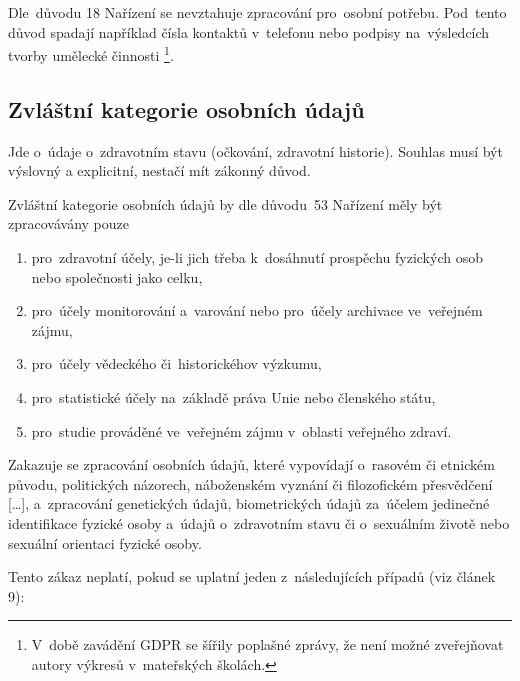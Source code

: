 Dle~důvodu 18 Nařízení se nevztahuje zpracování pro~osobní potřebu.
Pod~tento důvod spadají například čísla kontaktů v~telefonu nebo podpisy na~výsledcích tvorby umělecké činnosti%
\footnote{V~době zavádění GDPR se šířily poplašné zprávy, že není možné zveřejňovat autory výkresů v~mateřských školách.}.

\subsection{Zvláštní kategorie osobních údajů}

Jde o~údaje o~zdravotním stavu (očkování, zdravotní historie).
Souhlas musí být výslovný a explicitní, nestačí mít zákonný důvod.

Zvláštní kategorie osobních údajů by dle důvodu~53 Nařízení měly být zpracovávány pouze

\begin{enumerate}[label=\alph*)]
\item pro~zdravotní účely, je-li jich třeba k~dosáhnutí prospěchu fyzických osob nebo společnosti jako celku,
\item pro~účely monitorování a~varování nebo pro~účely archivace ve~veřejném zájmu,
\item pro~účely vědeckého či~historickéhov výzkumu,
\item pro~statistické účely na~základě práva Unie nebo členského státu,
\item pro~studie prováděné ve~veřejném zájmu v~oblasti veřejného zdraví.
\end{enumerate}

Zakazuje se zpracování osobních údajů, které vypovídají o~rasovém či etnickém původu, politických názorech, náboženském vyznání či filozofickém přesvědčení [\dots], a~zpracování genetických údajů, biometrických údajů za~účelem jedinečné identifikace fyzické osoby a~údajů o~zdravotním stavu či o~sexuálním životě nebo sexuální orientaci fyzické osoby.

Tento zákaz neplatí, pokud se uplatní jeden z~následujících případů (viz článek 9):

